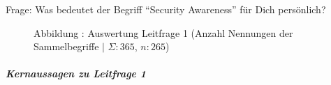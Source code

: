 \documentclass[../../main.tex]{subfiles}
\begin{document}
\begin{sloppypar}
Frage: Was bedeutet der Begriff "`Security Awareness"' für Dich persönlich?
\end{sloppypar}

\addtocounter{figure}{1}\begin{figure}[H]
    
    \vspace*{-5mm}
    \caption*{Abbildung \thefigure: Auswertung Leitfrage 1 (Anzahl Nennungen der Sammelbegriffe $\vert$ $\Sigma: 365$, $n: 265$)}
    \label{pgfplot_leitfrage1}
\end{figure}

\subparagraph*{Kernaussagen zu Leitfrage 1}\mbox{}

\end{document}
